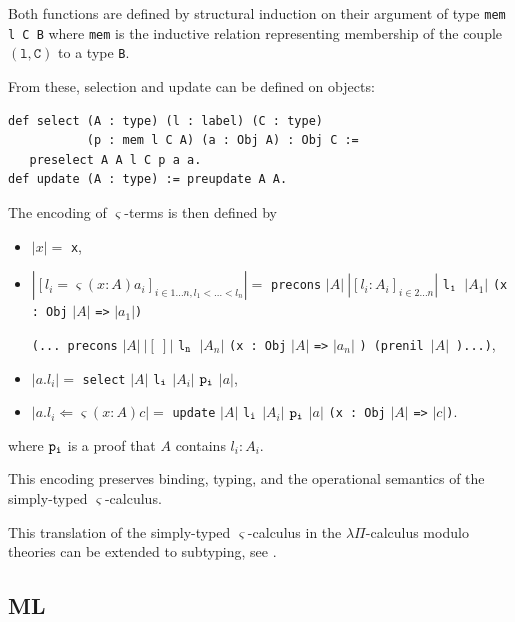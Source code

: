 \documentclass[english]{lipics}
\newcommand\lst[1]{{\rm \lstinline{#1}}}
\begin{document}
Both functions are defined by structural induction on their argument
of type \texttt{mem l C B} where \texttt{mem} is the inductive relation
representing membership of the couple $(\texttt{l}, \texttt{C})$ to a
type \texttt{B}.

From these, selection and update can be defined on objects:
\begin{lstlisting}
def select (A : type) (l : label) (C : type)
           (p : mem l C A) (a : Obj A) : Obj C :=
   preselect A A l C p a a.
def update (A : type) := preupdate A A.
\end{lstlisting}

\begin{definition}
The encoding of $\varsigma$-terms is then defined by
\begin{itemize}
\item $|x| =$ \lst{x},
\item $|[l_i = \varsigma(x : A) a_i]_{i \in 1\ldots n, l_1 < \ldots < l_n}| =$
\lst{precons} $|A|~|[l_i:A_i]_{i\in 2 \ldots n}|$ \lst{l}$_{\tt 1}$~$|A_1|$
\lst{(x : Obj} $|A|$ \lst{=>} $|a_1|$\lst{)}

\hfill
\lst{(... precons} $|A|~|[~]|$ \lst{l}$_{\tt n}$~$|A_n|$
\lst{(x : Obj} $|A|$ \lst{=>} $|a_n|$ \lst{)}~\lst{(prenil}~$|A|$~\lst{)...)},
\item $|a.l_i|  =$ \lst{select} $|A|$ \lst{l}$_{\tt i}$ $|A_i|$ $\tt p_i$ $|a|$,
\item $|a.l_i\Leftarrow\varsigma(x : A) c| =$ \lst{update} $|A|$
\lst{l}$_{\tt i}$ $|A_i|$ $\tt p_i$ $|a|$ \lst{(x : Obj} $|A|$ \lst{=>} $|c|$\lst{)}.
\end{itemize}
where $\tt p_i$ is a proof that $A$ contains $l_i : A_i$.
\end{definition}

\begin{lemma}
 This encoding preserves binding, typing, and the operational semantics of the simply-typed $\varsigma$-calculus.
\end{lemma}

This translation of the simply-typed $\varsigma$-calculus in the
$\lambda\Pi$-calculus modulo theories can be extended to subtyping,
see \cite{CauderlierDubois2014}.

\subsection{ML}
\end{document}
